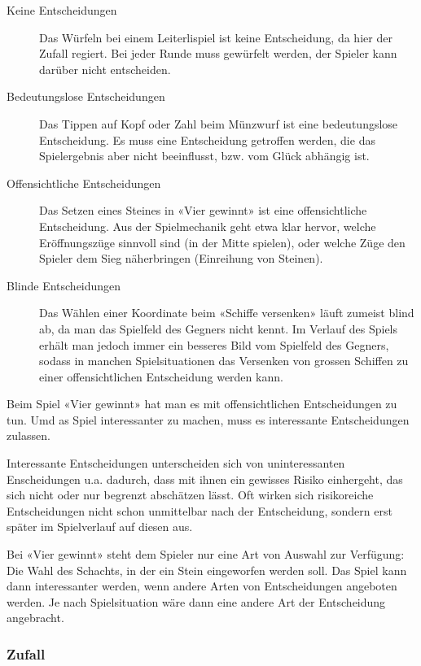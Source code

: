 \documentclass[a4paper,11pt,hidelinks]{scrartcl}
\begin{document}
\begin{description}
    \item[Keine Entscheidungen] Das Würfeln bei einem Leiterlispiel ist keine Entscheidung, da hier der Zufall regiert. Bei jeder Runde muss gewürfelt werden, der Spieler kann darüber nicht entscheiden.
    \item[Bedeutungslose Entscheidungen] Das Tippen auf Kopf oder Zahl beim Münzwurf ist eine bedeutungslose Entscheidung. Es muss eine Entscheidung getroffen werden, die das Spielergebnis aber nicht beeinflusst, bzw. vom Glück abhängig ist.
    \item[Offensichtliche Entscheidungen] Das Setzen eines Steines in «Vier gewinnt» ist eine offensichtliche Entscheidung. Aus der Spielmechanik geht etwa klar hervor, welche Eröffnungszüge sinnvoll sind (in der Mitte spielen), oder welche Züge den Spieler dem Sieg näherbringen (Einreihung von Steinen).
    \item[Blinde Entscheidungen] Das Wählen einer Koordinate beim «Schiffe versenken» läuft zumeist blind ab, da man das Spielfeld des Gegners nicht kennt. Im Verlauf des Spiels erhält man jedoch immer ein besseres Bild vom Spielfeld des Gegners, sodass in manchen Spielsituationen das Versenken von grossen Schiffen zu einer offensichtlichen Entscheidung werden kann.
\end{description}

Beim Spiel «Vier gewinnt» hat man es mit offensichtlichen Entscheidungen zu tun. Umd as Spiel interessanter zu machen, muss es interessante Entscheidungen zulassen.

Interessante Entscheidungen unterscheiden sich von uninteressanten Enscheidungen u.a. dadurch, dass mit ihnen ein gewisses Risiko einhergeht, das sich nicht oder nur begrenzt abschätzen lässt. Oft wirken sich risikoreiche Entscheidungen nicht schon unmittelbar nach der Entscheidung, sondern erst später im Spielverlauf auf diesen aus.

Bei «Vier gewinnt» steht dem Spieler nur eine Art von Auswahl zur Verfügung: Die Wahl des Schachts, in der ein Stein eingeworfen werden soll. Das Spiel kann dann interessanter werden, wenn andere Arten von Entscheidungen angeboten werden. Je nach Spielsituation wäre dann eine andere Art der Entscheidung angebracht.

\subsubsection{Zufall}
\end{document}
